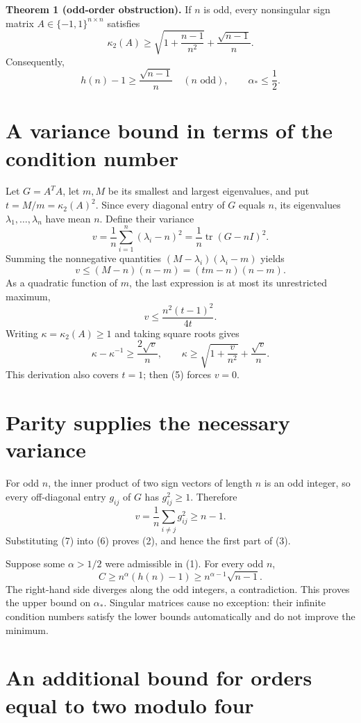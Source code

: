 \documentclass[10pt,a4paper]{article}
\begin{document}
\textbf{Theorem 1 (odd-order obstruction).} If \(n\) is odd, every
nonsingular sign matrix \(A\in\{-1,1\}^{n\times n}\) satisfies \[
 \kappa_2(A)\ge
 \sqrt{1+\frac{n-1}{n^2}}+\frac{\sqrt{n-1}}{n}.
 \tag{2}
\] Consequently, \[
 h(n)-1\ge\frac{\sqrt{n-1}}n\quad(n\text{ odd}),
 \qquad \boxed{\alpha_*\le\frac12}.
 \tag{3}
\]

\section{A variance bound in terms of the condition
number}\label{a-variance-bound-in-terms-of-the-condition-number}

Let \(G=A^TA\), let \(m,M\) be its smallest and largest eigenvalues, and
put \(t=M/m=\kappa_2(A)^2\). Since every diagonal entry of \(G\) equals
\(n\), its eigenvalues \(\lambda_1,\ldots,\lambda_n\) have mean \(n\).
Define their variance \[
 v=\frac1n\sum_{i=1}^n(\lambda_i-n)^2
   =\frac1n\operatorname{tr}(G-nI)^2.
 \tag{4}
\] Summing the nonnegative quantities \((M-\lambda_i)(\lambda_i-m)\)
yields \[
 v\le(M-n)(n-m)=(tm-n)(n-m).
\] As a quadratic function of \(m\), the last expression is at most its
unrestricted maximum, \[
 v\le\frac{n^2(t-1)^2}{4t}.
 \tag{5}
\] Writing \(\kappa=\kappa_2(A)\ge1\) and taking square roots gives \[
 \kappa-\kappa^{-1}\ge\frac{2\sqrt v}{n},
 \qquad
 \kappa\ge\sqrt{1+\frac v{n^2}}+\frac{\sqrt v}{n}.
 \tag{6}
\] This derivation also covers \(t=1\); then (5) forces \(v=0\).

\section{Parity supplies the necessary
variance}\label{parity-supplies-the-necessary-variance}

For odd \(n\), the inner product of two sign vectors of length \(n\) is
an odd integer, so every off-diagonal entry \(g_{ij}\) of \(G\) has
\(g_{ij}^2\ge1\). Therefore \[
 v=\frac1n\sum_{i\ne j}g_{ij}^2\ge n-1.
 \tag{7}
\] Substituting (7) into (6) proves (2), and hence the first part of
(3).

Suppose some \(\alpha>1/2\) were admissible in (1). For every odd \(n\),
\[
 C\ge n^\alpha(h(n)-1)
   \ge n^{\alpha-1}\sqrt{n-1}.
\] The right-hand side diverges along the odd integers, a contradiction.
This proves the upper bound on \(\alpha_*\). Singular matrices cause no
exception: their infinite condition numbers satisfy the lower bounds
automatically and do not improve the minimum.

\section{An additional bound for orders equal to two modulo
four}\label{an-additional-bound-for-orders-equal-to-two-modulo-four}
\end{document}
